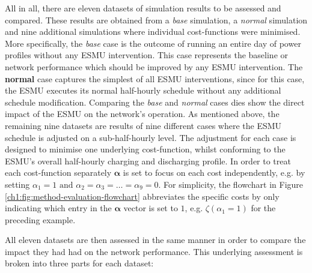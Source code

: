 All in all, there are eleven datasets of simulation results to be assessed and compared.
These results are obtained from a \textit{base} simulation, a \textit{normal} simulation and nine additional simulations where individual cost-functions were minimised.
More specifically, the \textit{base} case is the outcome of running an entire day of power profiles without any ESMU intervention.
This case represents the baseline or network performance which should be improved by any ESMU intervention.
The \textbf{normal} case captures the simplest of all ESMU interventions, since for this case, the ESMU executes its normal half-hourly schedule without any additional schedule modification.
Comparing the \textit{base} and \textit{normal} cases dies show the direct impact of the ESMU on the network's operation.
As mentioned above, the remaining nine datasets are results of nine different cases where the ESMU schedule is adjusted on a sub-half-hourly level.
The adjustment for each case is designed to minimise one underlying cost-function, whilst conforming to the ESMU's overall half-hourly charging and discharging profile.
In order to treat each cost-function separately $\boldsymbol{\alpha}$ is set to focus on each cost independently, e.g. by setting $\alpha_1 = 1 \text{ and } \alpha_2 = \alpha_3 = \dots = \alpha_9 = 0$.
For simplicity, the flowchart in Figure \ref{ch1:fig:method-evaluation-flowchart} abbreviates the specific costs by only indicating which entry in the $\boldsymbol{\alpha}$ vector is set to $1$, e.g. $\zeta(\alpha_1=1)$ for the preceding example.

All eleven datasets are then assessed in the same manner in order to compare the impact they had had on the network performance.
This underlying assessment is broken into three parts for each dataset:

